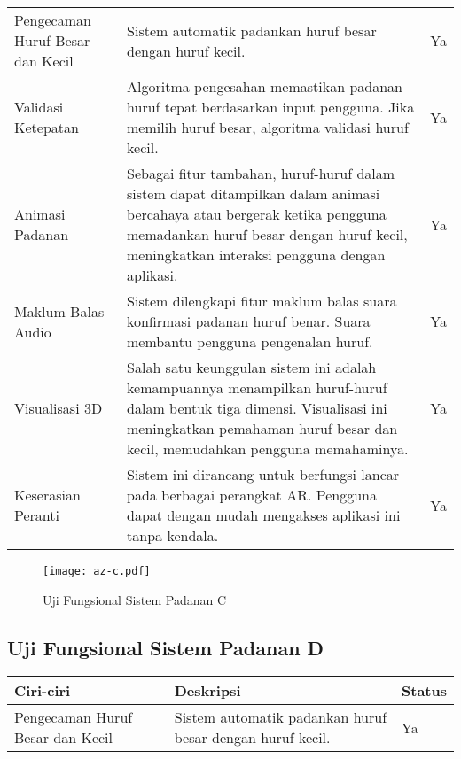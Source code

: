 \begin{itemize}
\begin{itemize}
\begin{itemize}
\begin{itemize}
\begin{itemize}
\begin{itemize}
\begin{itemize}
\begin{itemize}
\begin{flushleft}
\begin{tabular}[h]{>{\raggedright}p{3cm}p{9cm}>{\centering\arraybackslash}p{2cm}}
Pengecaman Huruf Besar dan Kecil & Sistem automatik padankan huruf besar dengan huruf kecil. & Ya \\

Validasi Ketepatan & Algoritma pengesahan memastikan padanan huruf tepat berdasarkan input pengguna. Jika memilih huruf besar, algoritma validasi huruf kecil. & Ya \\

Animasi Padanan & Sebagai fitur tambahan, huruf-huruf dalam sistem dapat ditampilkan dalam animasi bercahaya atau bergerak ketika pengguna memadankan huruf besar dengan huruf kecil, meningkatkan interaksi pengguna dengan aplikasi. & Ya \\

Maklum Balas Audio & Sistem dilengkapi fitur maklum balas suara konfirmasi padanan huruf benar. Suara membantu pengguna pengenalan huruf. & Ya \\

Visualisasi 3D & Salah satu keunggulan sistem ini adalah kemampuannya menampilkan huruf-huruf dalam bentuk tiga dimensi. Visualisasi ini meningkatkan pemahaman huruf besar dan kecil, memudahkan pengguna memahaminya. & Ya \\

Keserasian Peranti & Sistem ini dirancang untuk berfungsi lancar pada berbagai perangkat AR. Pengguna dapat dengan mudah mengakses aplikasi ini tanpa kendala. & Ya \\
\bottomrule
\end{tabular}




\begin{figure}[h]
    \centering
    \texttt{[image: az-c.pdf]}
    \caption{ Uji Fungsional  Sistem Padanan C }
    \label{az-c.pdf}
\end{figure}
\clearpage





\subsection{ Uji Fungsional  Sistem Padanan D }

\begin{tabular}{>{\raggedright}p{3cm}p{9cm}>{\centering\arraybackslash}p{2cm}}
\toprule
\textbf{Ciri-ciri} & \textbf{Deskripsi} & \textbf{Status} \\
\midrule
Pengecaman Huruf Besar dan Kecil & Sistem automatik padankan huruf besar dengan huruf kecil. & Ya \\


\end{tabular}
\end{flushleft}
\end{itemize}
\end{itemize}
\end{itemize}
\end{itemize}
\end{itemize}
\end{itemize}
\end{itemize}
\end{itemize}
